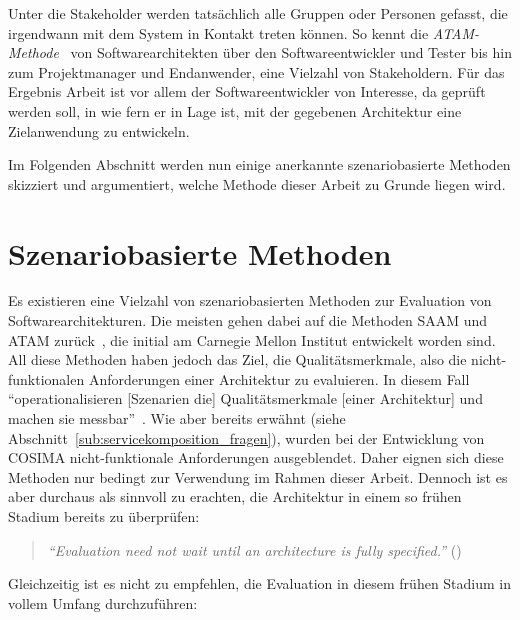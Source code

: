   Unter die Stakeholder werden tatsächlich alle Gruppen oder Personen gefasst, die irgendwann mit dem System in Kontakt treten können. So kennt die \emph{ATAM-Methode}~ von Softwarearchitekten über den Softwareentwickler und Tester bis hin zum Projektmanager und Endanwender, eine Vielzahl von Stakeholdern. Für das Ergebnis Arbeit ist vor allem der Softwareentwickler von Interesse, da geprüft werden soll, in wie fern er in Lage ist, mit der gegebenen Architektur eine Zielanwendung zu entwickeln.
  
  Im Folgenden Abschnitt werden nun einige anerkannte szenariobasierte Methoden skizziert und argumentiert, welche Methode dieser Arbeit zu Grunde liegen wird.

  
\section{Szenariobasierte Methoden} %
\label{sec:szenariobasierte_methoden}

  Es existieren eine Vielzahl von szenariobasierten Methoden zur Evaluation von Softwarearchitekturen. Die meisten gehen dabei auf die Methoden SAAM und ATAM zurück~\citep[S. 1]{scenario_based_software_architecture_evaluation_methods}, die initial am Carnegie Mellon Institut entwickelt worden sind. All diese Methoden haben jedoch das Ziel, die Qualitätsmerkmale, also die nicht-funktionalen Anforderungen einer Architektur zu evaluieren. In diesem Fall "`operationalisieren [Szenarien die] Qualitätsmerkmale [einer Architektur] und machen sie messbar"'~\citep[S. 61]{effektive_software_architekturen}. Wie aber bereits erwähnt (siehe Abschnitt~\ref{sub:servicekomposition_fragen}), wurden bei der Entwicklung von COSIMA nicht-funktionale Anforderungen ausgeblendet. Daher eignen sich diese Methoden nur bedingt zur Verwendung im Rahmen dieser Arbeit. Dennoch ist es aber durchaus als sinnvoll zu erachten, die Architektur in einem so frühen Stadium bereits zu überprüfen:
  
  \begin{quote}
    \emph{"`Evaluation need not wait until an architecture is fully specified."'} (\citep[S. 24]{evaluating_software_architectures})
  \end{quote}
  
  Gleichzeitig ist es nicht zu empfehlen, die Evaluation in diesem frühen Stadium in vollem Umfang durchzuführen:
  
